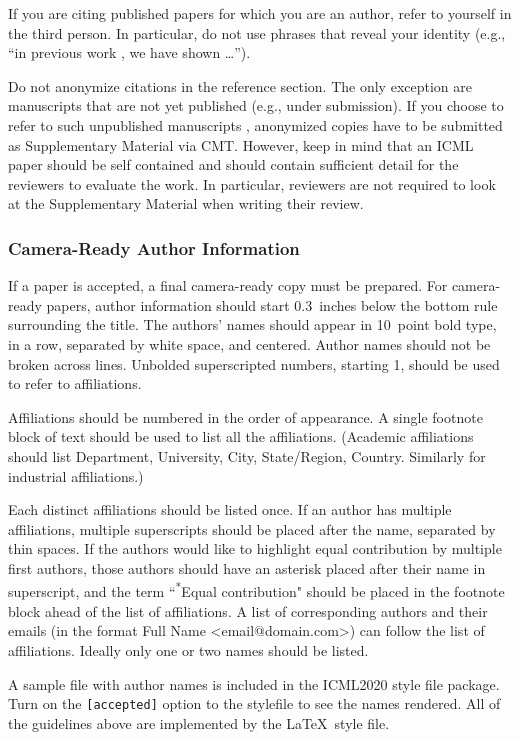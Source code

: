 \documentclass{article}
\begin{document}
If you are citing published papers for which you are an author, refer
to yourself in the third person. In particular, do not use phrases
that reveal your identity (e.g., ``in previous work \cite{langley00}, we
have shown \ldots'').

Do not anonymize citations in the reference section. The only exception are manuscripts that are
not yet published (e.g., under submission). If you choose to refer to
such unpublished manuscripts \cite{anonymous}, anonymized copies have
to be submitted
as Supplementary Material via CMT\@. However, keep in mind that an ICML
paper should be self contained and should contain sufficient detail
for the reviewers to evaluate the work. In particular, reviewers are
not required to look at the Supplementary Material when writing their
review.

\subsubsection{Camera-Ready Author Information}
\label{final author}

If a paper is accepted, a final camera-ready copy must be prepared.
%
For camera-ready papers, author information should start 0.3~inches below the
bottom rule surrounding the title. The authors' names should appear in 10~point
bold type, in a row, separated by white space, and centered. Author names should
not be broken across lines. Unbolded superscripted numbers, starting 1, should
be used to refer to affiliations.

Affiliations should be numbered in the order of appearance. A single footnote
block of text should be used to list all the affiliations. (Academic
affiliations should list Department, University, City, State/Region, Country.
Similarly for industrial affiliations.)

Each distinct affiliations should be listed once. If an author has multiple
affiliations, multiple superscripts should be placed after the name, separated
by thin spaces. If the authors would like to highlight equal contribution by
multiple first authors, those authors should have an asterisk placed after their
name in superscript, and the term ``\textsuperscript{*}Equal contribution"
should be placed in the footnote block ahead of the list of affiliations. A
list of corresponding authors and their emails (in the format Full Name
\textless{}email@domain.com\textgreater{}) can follow the list of affiliations.
Ideally only one or two names should be listed.

A sample file with author names is included in the ICML2020 style file
package. Turn on the \texttt{[accepted]} option to the stylefile to
see the names rendered. All of the guidelines above are implemented
by the \LaTeX\ style file.
\end{document}
